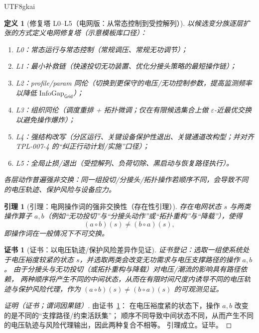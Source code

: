 \documentclass[12pt]{article}
\newtheorem{definition}{定义}[section]
\newtheorem{lemma}{引理}[section]
\newtheorem{Certificate}{证书}[section]
\begin{document}
\begin{CJK*}{UTF8}{gkai}
\begin{definition}[修复塔 L0--L5（电网版：从常态控制到受控解列）]
\label{def:grid-repair-tower}
以候选变分族逐层扩张的方式定义电网修复塔（示意模板库口径）：
\begin{enumerate}
  \item L0：常态运行与常态控制（常规调压、常规无功调节）；
  \item L1：最小补救链（快速投切无功装置、优化分接头策略的最短操作链）；
  \item L2：profile/param 同伦（切换到更保守的电压/无功控制参数，提高监测频率以降低 $\mathrm{InfoGap}_{\mathsf{Grid}}$）；
  \item L3：组织同伦（调度重排 + 拓扑微调；仅在有限候选集合上做 $\varepsilon$-近最优交换以避免操作爆炸）；
  \item L4：强结构改写（分区运行、关键设备保护性退出、关键通道改构型；并对齐 \textsf{TPL-007-4} 的“纠正行动计划/实施”口径）\cite{ref_nerc_tpl_007_4}；
  \item L5：全局止损/退出（受控解列、负荷切除、黑启动与恢复路径执行）。
\end{enumerate}
各层动作普遍强非交换：同一组投切/分接头/拓扑操作若顺序不同，会导致不同的电压轨迹、保护风险与设备应力。
\end{definition}

\begin{lemma}[引理：电网操作词的强非交换性（存在性引理）]
\label{lem:grid-operator-word-noncommutative}
存在电网状态 $s$ 与两类操作算子 $a,b$（例如“无功投切”与“分接头动作”或“拓扑重构”与“降载”），使得
\[
  (a\circ b)(s)\neq (b\circ a)(s),
\]
即操作词在一般情况下不可交换。
\end{lemma}

\begin{Certificate}[证书：以电压轨迹/保护风险差异作见证]
\label{cert:grid-operator-word-noncommutative}
证书登记：选取一组使系统处于电压裕度较紧的状态 $s$，并选取两类会改变无功需求与电压支撑路径的操作 $a,b$。
由于分接头与无功投切（或拓扑重构与降载）对电压/潮流的影响具有路径依赖，
两种顺序将产生不同的中间状态，从而在有限时间尺度内诱导不同的电压轨迹与保护风险代理，作为 $(a\circ b)(s)\neq (b\circ a)(s)$ 的可观测见证。
\end{Certificate}

\begin{proof}[证明（证书；谓词因果链）]
由证书~\ref{cert:grid-operator-word-noncommutative}：
在电压裕度紧的状态下，操作 $a,b$ 改变的是不同的“支撑路径/约束活跃集”；
顺序不同导致中间状态不同，从而产生不同的电压轨迹与风险代理输出，因此两种复合不相等。
引理成立。证毕。
\end{proof}


\end{CJK*}
\end{document}

